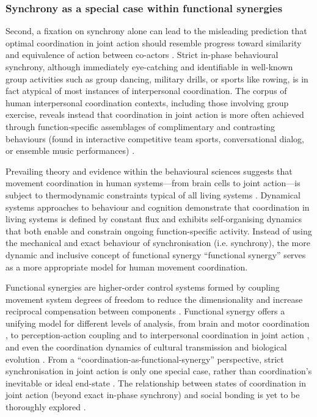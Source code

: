 \begin{CJK}{UTF8}{gbsn}
\subsubsection{Synchrony as a special case within functional synergies}
Second, a fixation on synchrony alone can lead to the misleading prediction that optimal coordination in joint action should resemble progress toward similarity and equivalence of action between co-actors \citep{Fusaroli2014}.  Strict in-phase behavioural synchrony, although immediately eye-catching and identifiable in well-known group activities such as group dancing, military drills, or sports like rowing, is in fact atypical of most instances of interpersonal coordination.  The corpus of human interpersonal coordination contexts, including those involving group exercise, reveals instead that coordination in joint action is more often achieved through function-specific assemblages of complimentary and contrasting behaviours (found in interactive competitive team sports, conversational dialog, or ensemble music performances) \citep{Novembre2014}.

Prevailing theory and evidence within the behavioural sciences suggests that movement coordination in human systems---from brain cells to joint action---is subject to thermodynamic constraints typical of all living systems \citep{Turvey1977,Yufik2013}.  Dynamical systems approaches to behaviour and cognition demonstrate that coordination in living systems is defined by constant flux and exhibits self-organising dynamics that both enable and constrain ongoing function-specific activity. Instead of using the mechanical and exact behaviour of synchronisation (i.e. synchrony), the more dynamic and inclusive concept of functional synergy ``functional synergy'' \citep{Turvey1990} serves as a more appropriate model for human movement coordination.

Functional synergies are higher-order control systems formed by coupling movement system degrees of freedom to reduce the dimensionality and increase reciprocal compensation between components \citep{Turvey1978}.  Functional synergy offers a unifying model for different levels of analysis, from brain \citep{Yufik2013} and motor coordination \citep{Latash2007}, to perception-action coupling \citep{Kelso2009} and to interpersonal coordination in joint action \citep{Riley2011,Schmidt1990}, and even the coordination dynamics of cultural transmission \citep{Claidiere2007} and biological evolution \citep{Laland2015}.  From a ``coordination-as-functional-synergy'' perspective, strict synchronisation in joint action is only one special case, rather than coordination's inevitable or ideal end-state \citep[][pg. 128; Richardson, personal communication]{Kelso2013}.  The relationship between states of coordination in joint action (beyond exact in-phase synchrony) and social bonding is yet to be thoroughly explored \citep[but for a preliminary approach, see][]{Marsh2009}.



\end{CJK}
